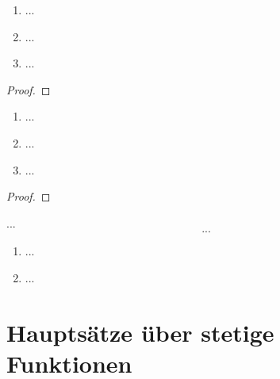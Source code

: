 \documentclass[12pt]{scrreprt}
\begin{document}
\begin{bsp}\label{bsp:fnkt.uebertragung-stetigk}
\begin{enumerate}
\item ...\label{bsp:fnkt.uebertragung-stetigk.a}
\item ...\label{bsp:fnkt.uebertragung-stetigk.b}
\item ...\label{bsp:fnkt.uebertragung-stetigk.c}
\end{enumerate}
\end{bsp}

\begin{thm}\label{thm:fnkt.stetigk-potreihe}

\end{thm}
\begin{bsp*}

\end{bsp*}
\begin{proof}

\end{proof}

\begin{satz}\label{satz:fnkt.stetigk-aequiv}
\begin{enumerate}
\item ...\label{satz:fnkt.stetigk-aequiv.a}
\item ...\label{satz:fnkt.stetigk-aequiv.b}
\item ...\label{satz:fnkt.stetigk-aequiv.c}
\end{enumerate}
\end{satz}
\begin{proof}

\end{proof}

\begin{dfn}\label{dfn:fnkt.glm-stetig}
...
\begin{equation}\label{eqn:fnkt.glm-stetig}
...
\end{equation}
\end{dfn}

\begin{bsp}\label{bsp:fnkt.glm-stetig}
\begin{enumerate}
\item ...\label{bsp:fnkt.glm-stetig.a}
\item ...\label{bsp:fnkt.glm-stetig.b}
\end{enumerate}
\end{bsp}

\section{Hauptsätze über stetige Funktionen}
\label{sec:fnkt.hauptsaetze}
\end{document}
